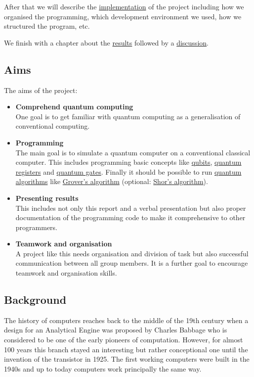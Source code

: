 \documentclass[bibliography=totocnumbered]{article}
\theoremstyle{NoticeStyle}
\begin{document}
After that we will describe the \hyperref[sec:Implementation]{implementation} of the project including how we organised the programming, which development environment we used, how we structured the program, etc.

We finish with a chapter about the \hyperref[sec:Results]{results} followed by a \hyperref[sec:Discussion]{discussion}.


\subsection{Aims}\label{sec:Aims}

The aims of the project:
\begin{itemize}
	\item \textbf{Comprehend quantum computing}\\
	One goal is to get familiar with quantum computing as a generalisation of conventional computing.
	\item \textbf{Programming}\\
	The main goal is to simulate a quantum computer on a conventional classical computer. This includes programming basic concepts like \hyperref[sec:Qubits]{qubits}, \hyperref[sec:Quantum register]{quantum registers} and \hyperref[sec:Quantum gates]{quantum gates}. Finally it should be possible to run \hyperref[sec:Quantum algorithms]{quantum algorithms} like \hyperref[sec:Grover]{Grover's algorithm} (optional: \hyperref[sec:Shor]{Shor's algorithm}).
	\item \textbf{Presenting results}\\
	This includes not only this report and a verbal presentation but also proper documentation of the programming code to make it comprehensive to other programmers.
	\item \textbf{Teamwork and organisation}\\
	A project like this needs organisation and division of task but also successful communication between all group members. It is a further goal to encourage teamwork and organisation skills.
\end{itemize} 

\subsection{Background}\label{sec:Background}

The history of computers reaches back to the middle of the 19th century when a design for an Analytical Engine
was proposed by Charles Babbage who is considered to be one of the early pioneers of computation. However, for almost 100 years this branch stayed an interesting but rather conceptional one until the invention of the transistor in 1925. The first working computers were built in the 1940s and up to today computers work principally the same way.
\end{document}
